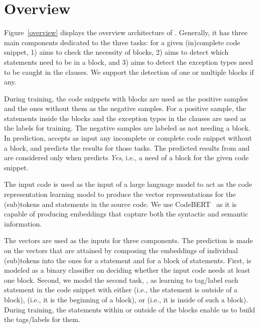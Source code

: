 \section{{\tool} Overview}
\label{sec:overview}

Figure~\ref{overview} displays the overview architecture of
{\tool}. Generally, it has three main components dedicated to the
three tasks: for a given (in)complete code snippet, 1) {\xblock} aims
to check the necessity of  blocks, 2){\xstate} aims to
detect which statements need to be in a  block, and 3)
{\xtype} aims to detect the exception types need to be caught in the
 clauses. We support the detection of one or multiple
 blocks if any.

During training, the code snippets with  blocks are
used as the positive samples and the ones without them as the negative
samples. For a positive sample, the statements inside the 
blocks and the exception types in the  clauses are used as
the labels for training. The negative samples are labeled as not
needing a  block. In prediction, {\tool} accepts as
input any incomplete or complete code snippet without a
 block, and predicts the results for those tasks. The
predicted results from {\xstate} and {\xtype} are considered only when
{\xblock} predicts {\em Yes}, i.e., a need of a 
block for the given code snippet.

The input code is used as the input of a large language model to act
as the code representation learning model to produce the vector
representations for the (sub)tokens and statements in the source
code. We use CodeBERT~\cite{codebert-emnlp20} as it is
capable of producing embeddings that capture both the
syntactic and semantic information.

The vectors are used as the inputs for three components. The
prediction is made on the vectors that are attained by composing the
embeddings of individual (sub)tokens into the ones for a statement and
for a block of statements. First, {\xblock} is modeled as a binary
classifier on deciding whether the input code needs at least one
 block. Second, we model the second task, {\xstate},
as learning to tag/label each statement in the code snippet with
either  (i.e., the statement is outside of a 
block),  (i.e., it is the beginning of a 
block), or  (i.e., it is inside of such a block).
During training, the statements within or outside of the
 blocks enable us to build the tags/labels for them.

